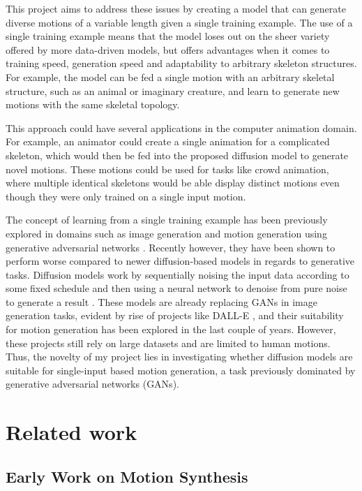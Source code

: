 \documentclass[a4paper, 12pt]{report}
\begin{document}
This project aims to address these issues by creating a model that can generate diverse motions of a variable length given a single training example. The use of a single training example means that the model loses out on the sheer variety offered by more data-driven models, but offers advantages when it comes to training speed, generation speed and adaptability to arbitrary skeleton structures. For example, the model can be fed a single motion with an arbitrary skeletal structure, such as an animal or imaginary creature, and learn to generate new motions with the same skeletal topology. 

This approach could have several applications in the computer animation domain. For example, an animator could create a single animation for a complicated skeleton, which would then be fed into the proposed diffusion model to generate novel motions. These motions could be used for tasks like crowd animation, where multiple identical skeletons would be able display distinct motions even though they were only trained on a single input motion.

The concept of learning from a single training example has been previously explored in domains such as image generation and motion generation using generative adversarial networks \cite{li_ganimator_2022}. Recently however, they have been shown to perform worse compared to newer diffusion-based models in regards to generative tasks. Diffusion models work by sequentially noising the input data according to some fixed schedule and then using a neural network to denoise from pure noise to generate a result \cite{ho_denoising_2020}. These models are already replacing GANs in image generation tasks, evident by rise of projects like DALL-E \cite{ramesh_zero-shot_2021}, and their suitability for motion generation has been explored in the last couple of years. However, these projects still rely on large datasets and are limited to human motions. Thus, the novelty of my project lies in investigating whether diffusion models are suitable for single-input based motion generation, a task previously dominated by generative adversarial networks (GANs).

\chapter{Related work}

\section{Early Work on Motion Synthesis}
\end{document}

